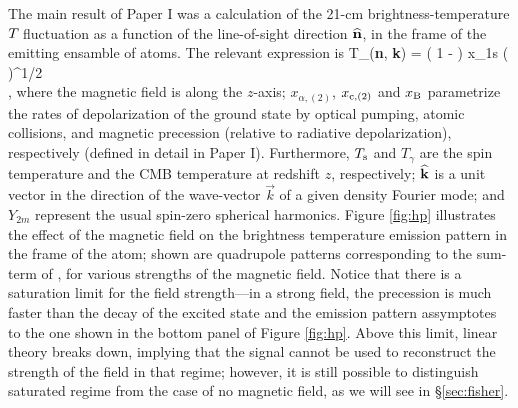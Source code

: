 The main result of Paper I was a calculation of the 21-cm brightness-temperature $T_{\rm }$ fluctuation as a function of the line-of-sight direction ${\bf{\widehat n}}$, in the frame of the emitting ensamble of atoms. The relevant expression is
\beq
\bga
   T_{\rm }({\bf{\widehat n}}, {\bf{\widehat k}}) = \left( 1 -  \right) x_{1{\rm s}} \left(  \right)^{1/2} \\
  \times {} \mbox{,} 
\ega
\label{eq:tbsoln}
\eeq
where the magnetic field is along the $z$-axis; $x_{\alpha, (2)}$, $x_{{\rm c}, (2)}$ and $x_{\rm B}$ parametrize the rates of depolarization of the ground state by optical pumping, atomic collisions, and magnetic precession (relative to radiative depolarization), respectively (defined in detail in Paper I). Furthermore,  $T_{\rm s}$ and $T_\gamma$ are the spin temperature and the CMB temperature at redshift $z$, respectively; $\bf{\widehat k}$ is a unit vector in the direction of the wave-vector $\vec k$ of a given density Fourier mode; and $Y_{2 m}$ represent the usual spin-zero spherical harmonics. Figure \ref{fig:hp} illustrates the effect of the magnetic field on the brightness temperature emission pattern in the frame of the atom; shown are quadrupole patterns corresponding to the sum-term of \eq{\ref{eq:tbsoln}}, for various strengths of the magnetic field. Notice that there is a saturation limit for the field strength---in a strong field, the precession is much faster than the decay of the excited state and the emission pattern assymptotes to the one shown in the bottom panel of Figure \ref{fig:hp}. Above this limit, linear theory breaks down, implying that the signal cannot be used to reconstruct the strength of the field in that regime; however, it is still possible to distinguish saturated regime from the case of no magnetic field, as we will see in \S\ref{sec:fisher}.
